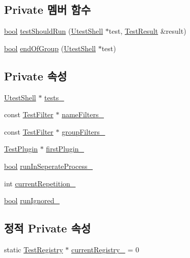 \subsection*{Private 멤버 함수}
\begin{DoxyCompactItemize}
\item 
\hyperlink{avb__gptp_8h_af6a258d8f3ee5206d682d799316314b1}{bool} \hyperlink{class_test_registry_a1a8176b8ede17cf96ba1ed88dfa3bc0c}{test\+Should\+Run} (\hyperlink{class_utest_shell}{Utest\+Shell} $\ast$test, \hyperlink{class_test_result}{Test\+Result} \&result)
\item 
\hyperlink{avb__gptp_8h_af6a258d8f3ee5206d682d799316314b1}{bool} \hyperlink{class_test_registry_aa7701b12c9e4e2e4e60b886234c329f1}{end\+Of\+Group} (\hyperlink{class_utest_shell}{Utest\+Shell} $\ast$test)
\end{DoxyCompactItemize}
\subsection*{Private 속성}
\begin{DoxyCompactItemize}
\item 
\hyperlink{class_utest_shell}{Utest\+Shell} $\ast$ \hyperlink{class_test_registry_ac25160ebe0919f203197a4c65a72b02e}{tests\+\_\+}
\item 
const \hyperlink{class_test_filter}{Test\+Filter} $\ast$ \hyperlink{class_test_registry_adceace73e87d3103509368cc7724c9dd}{name\+Filters\+\_\+}
\item 
const \hyperlink{class_test_filter}{Test\+Filter} $\ast$ \hyperlink{class_test_registry_ad16b28b9a22a924a6265edceab863e92}{group\+Filters\+\_\+}
\item 
\hyperlink{class_test_plugin}{Test\+Plugin} $\ast$ \hyperlink{class_test_registry_a87b15684d847549532b2219d0e4d3d83}{first\+Plugin\+\_\+}
\item 
\hyperlink{avb__gptp_8h_af6a258d8f3ee5206d682d799316314b1}{bool} \hyperlink{class_test_registry_afa76b0521126a402ac5587199151acd5}{run\+In\+Seperate\+Process\+\_\+}
\item 
int \hyperlink{class_test_registry_a7f21fe6b11eb96d498bb1890f70932de}{current\+Repetition\+\_\+}
\item 
\hyperlink{avb__gptp_8h_af6a258d8f3ee5206d682d799316314b1}{bool} \hyperlink{class_test_registry_a9aedd4f11eb25d8bd013c2463fccfea6}{run\+Ignored\+\_\+}
\end{DoxyCompactItemize}
\subsection*{정적 Private 속성}
\begin{DoxyCompactItemize}
\item 
static \hyperlink{class_test_registry}{Test\+Registry} $\ast$ \hyperlink{class_test_registry_aaf0cd2582cd35230daa8a5d15823f840}{current\+Registry\+\_\+} = 0
\end{DoxyCompactItemize}


